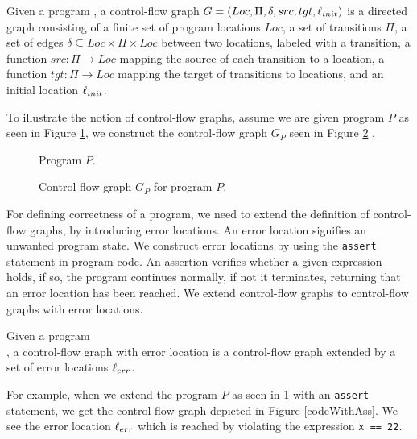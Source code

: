  \begin{mydef}
 	Given a program \prg, a control-flow graph $G = (Loc, \Pi, \delta, src, tgt, \ell_{init})$ is a directed graph consisting of a finite set of program locations $Loc$, a set of transitions $\Pi$, a set of edges $\delta \subseteq Loc \times \Pi \times Loc$ between two locations, labeled with a transition, a function $src: \Pi \rightarrow Loc$ mapping the source of each transition to a location, a function $tgt: \Pi \rightarrow Loc$ mapping the target of transitions to locations, and an initial location $\ell_{init}$. 
 \end{mydef}
To illustrate the notion of control-flow graphs, assume we are given program $P$ as seen in Figure \ref{codeNoAss}, we construct the control-flow graph $G_P$ seen in Figure \ref{cfg:P:Noass}
.\begin{center}
	\begin{minipage}[b]{0.4\linewidth}
		\begin{figure}[H]
			\centering
			
			\caption{Program $P$.}
			\label{codeNoAss}
		\end{figure}
	\end{minipage}
	\hfill
	\begin{minipage}[b]{0.59\linewidth}
		\begin{figure}[H]
			\centering
			
			\caption{Control-flow graph $G_P$ for program $P$.}
			\label{cfg:P:Noass}
		\end{figure}
	\end{minipage}
\end{center}
For defining correctness of a program, we need to extend the definition of control-flow graphs, by introducing error locations. An error location signifies an unwanted program state. We construct error locations by using the \texttt{assert} statement in program code. An assertion verifies whether a given expression holds, if so, the program continues normally, if not it terminates, returning that an error location has been reached. We extend control-flow graphs to control-flow graphs with error locations.
 \begin{mydef}
	Given a program \\ \prg, a control-flow graph with error location \cfg is a control-flow graph extended by a set of error locations $\ell_{err}$.
\end{mydef}
For example, when we extend the program $P$ as seen in \ref{codeNoAss} with an \texttt{assert} statement, we get the control-flow graph depicted in Figure \ref{codeWithAss}. We see the error location $\ell_{err}$ which is reached by violating the expression \texttt{x == 22}.
